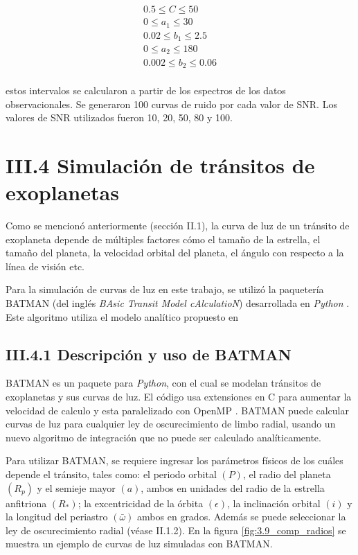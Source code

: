 \begin{equation}
  \begin{split}
  0.5 \leq C \leq 50 \\
  0 \leq a_{1} \leq 30 \\
  0.02 \leq b_{1} \leq 2.5 \\
  0 \leq a_{2} \leq 180 \\
  0.002 \leq b_{2} \leq 0.06 \\
  \end{split}
\end{equation}

estos intervalos se calcularon a partir de los espectros de los datos observacionales. Se generaron 100 curvas de ruido por cada valor de SNR. Los valores de SNR utilizados fueron 10, 20, 50, 80 y 100.


\section*{III.4 Simulación de tránsitos de exoplanetas}


Como se mencionó anteriormente (sección II.1), la curva de luz de un tránsito de exoplaneta depende de múltiples factores cómo el tamaño de la estrella, el tamaño del planeta, la velocidad orbital del planeta, el ángulo con respecto a la línea de visión etc.

Para la simulación de curvas de luz en este trabajo, se utilizó la paquetería BATMAN (del inglés \textit{BAsic Transit Model cAlculatioN}) desarrollada en \textit{Python} \cite{kreidberg2015batman}. Este algoritmo utiliza el modelo analítico propuesto en \cite{mandel2002analytic}


\subsection*{III.4.1 Descripción y uso de BATMAN}

BATMAN es un paquete para \textit{Python}, con el cual se modelan tránsitos de exoplanetas y sus curvas de luz. El código usa extensiones en C para aumentar la velocidad de calculo y esta paralelizado con OpenMP \cite{kreidberg2015batman}. BATMAN puede calcular curvas de luz para cualquier ley de oscurecimiento de limbo radial, usando un nuevo algoritmo de integración que no puede ser calculado analíticamente.

Para utilizar BATMAN, se requiere ingresar los parámetros físicos de los cuáles depende el tránsito, tales como: el periodo orbital $(P)$, el radio del planeta $(R_{p})$ y el semieje mayor $(a)$, ambos en unidades del radio de la estrella anfitriona $(R_{*})$;  la excentricidad de la órbita $(\epsilon)$, la inclinación orbital $(i)$ y la longitud del periastro $(\bar{\omega})$ ambos en grados. Además se puede seleccionar la ley de oscurecimiento radial (véase II.1.2). En la figura \ref{fig:3.9_comp_radios} se muestra un ejemplo de curvas de luz simuladas con BATMAN. 

